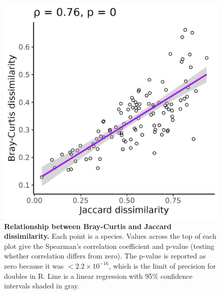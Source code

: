 \documentclass[12pt]{article}
\begin{document}
\begin{figure}[H]
    \centering
    \includegraphics[width=\textwidth]{figures/appendix_d/ida_jac_vs_bcd_2024-12-12.jpg}
    \caption{\textbf{Relationship between Bray-Curtis and Jaccard dissimilarity.} Each point is a species. Values across the top of each plot give the Spearman's correlation coefficient and p-value (testing whether correlation differs from zero). The p-value is reported as zero because it was $<2.2\times10^{-16}$, which is the limit of precision for doubles in R. Line is a linear regression with 95\% confidence intervals shaded in gray.}
\end{figure}
\end{document}
